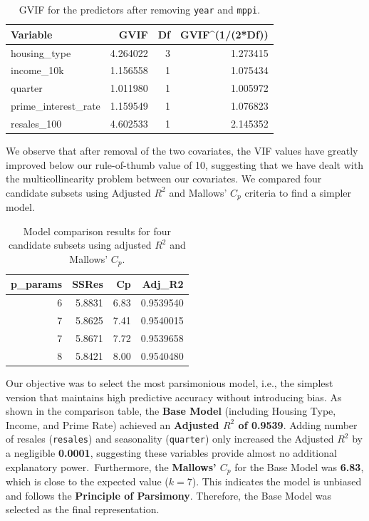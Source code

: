 \documentclass[10pt]{article}
\begin{document}
\begin{table}[H]
    \centering
    \small
    \begin{tabular}{lrrr}
        \toprule
        Variable & GVIF & Df & GVIF\textasciicircum{}(1/(2*Df)) \\
        \midrule
        housing\_type & 4.264022 & 3 & 1.273415 \\
        income\_10k & 1.156558 & 1 & 1.075434 \\
        quarter & 1.011980 & 1 & 1.005972 \\
        prime\_interest\_rate & 1.159549 & 1 & 1.076823 \\
        resales\_100 & 4.602533 & 1 & 2.145352 \\
        \bottomrule
    \end{tabular}
    \caption{GVIF for the predictors after removing \texttt{year} and \texttt{mppi}.}
\end{table}

We observe that after removal of the two covariates, the VIF values have greatly improved below our rule-of-thumb value of 10, suggesting that we have dealt with the multicollinearity problem between our covariates. We compared four candidate subsets using Adjusted $R^2$ and Mallows' $C_p$ criteria to find a simpler model.

\begin{table}[H]
    \centering
    \small
    \begin{tabular}{rrrr}
        \toprule
        p\_params & SSRes & Cp & Adj\_R2 \\
        \midrule
        6 & 5.8831 & 6.83 & 0.9539540 \\
        7 & 5.8625 & 7.41 & 0.9540015 \\
        7 & 5.8671 & 7.72 & 0.9539658 \\
        8 & 5.8421 & 8.00 & 0.9540480 \\
        \bottomrule
    \end{tabular}
    \caption{Model comparison results for four candidate subsets using adjusted $R^2$ and Mallows' $C_p$.}
\end{table}

Our objective was to select the most parsimonious model, i.e., the simplest version that maintains high predictive accuracy without introducing bias.
As shown in the comparison table, the \textbf{Base Model} (including Housing Type, Income, and Prime Rate) achieved an \textbf{Adjusted $R^2$ of 0.9539}. Adding number of resales (\texttt{resales}) and seasonality (\texttt{quarter}) only increased the Adjusted $R^2$ by a negligible \textbf{0.0001}, suggesting these variables provide almost no additional explanatory power.\
Furthermore, the \textbf{Mallows' $C_p$} for the Base Model was \textbf{6.83}, which is close to the expected value ($k=7$). This indicates the model is unbiased and follows the \textbf{Principle of Parsimony}.
Therefore, the Base Model was selected as the final representation.
\end{document}
